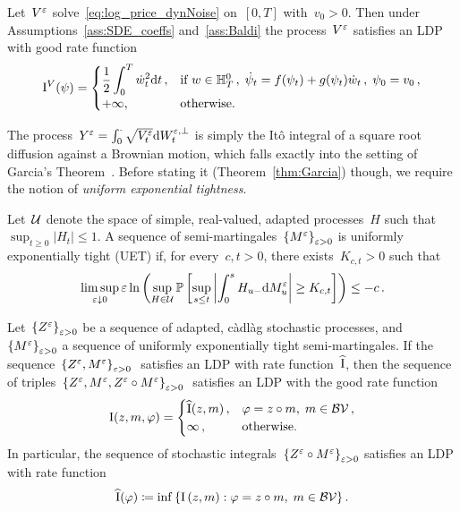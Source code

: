 \begin{theorem}
\label{thm:Baldi}
Let~$V^{\varepsilon}$ solve~\eqref{eq:log_price_dynNoise} on~$[0, T]$ with~$v_0>0$. Then under Assumptions~\ref{ass:SDE_coeffs} and~\ref{ass:Baldi} the process~$V^\varepsilon$ satisfies an LDP with good rate function
\[
\mathrm{I}^{V}(\psi)= \begin{cases}
\displaystyle \frac{1}{2} \int_{0}^{T} \dot{w}_t^2 \mathrm{d} t\,, 
& \text{if } w\in\mathbb{H}^0_T\,, \;\dot{\psi}_t = f(\psi_t) + g(\psi_t)\dot{w}_t\,, \;\psi_0 = v_0\,, \\ 
+\infty, & \text{otherwise}.
\end{cases}
\]
\end{theorem}
The process~$Y^\varepsilon=\int_0^\cdot \sqrt{V^\varepsilon_{t}} \mathrm{d} W^{\varepsilon,\perp}_{t}$ is simply the It{\^o} integral of a square root diffusion against a Brownian motion, which falls exactly into the setting of Garcia's Theorem~\cite{Garcia2007AIntegrals}. 
Before stating it (Theorem~\ref{thm:Garcia}) though, 
we require the notion of \textit{uniform exponential tightness}.
\begin{definition}\label{def:UET}
Let~$\mathcal{U}$ denote the space of simple, real-valued, adapted processes~$H$ such that~$\sup _{t \geq 0}\left|H_{t}\right| \leq 1$. A sequence of semi-martingales~$\left\{M^{\varepsilon}\right\}_{\varepsilon > 0}$ is uniformly exponentially tight (UET) if, for every~$c, t>0$, there exists~$K_{c, t}>0$ such that
\[
\limsup _{\varepsilon \downarrow 0} \varepsilon \ln \left(\sup _{H \in \mathcal{U}} \mathbb{P}\left[\sup _{s \leq t}\left|\int_{0}^{s} H_{u-} \mathrm{d} M_{u}^{\varepsilon}\right| \geq K_{c, t}\right]\right) \leq-c \,.
\]
\end{definition}
\begin{theorem}\label{thm:Garcia}
Let~$\left\{Z^{\varepsilon}\right\}_{\varepsilon > 0}$ be a sequence of adapted, c\`adl\`ag stochastic processes, and~$\left\{M^{\varepsilon}\right\}_{\varepsilon > 0}$ a sequence of uniformly exponentially tight semi-martingales. If the sequence~$\left\{Z^{\varepsilon}, M^{\varepsilon}\right\}_{\varepsilon > 0}~$ satisfies an LDP with rate function~$\widehat{\mathrm{I}}$, then the sequence of triples~$\left\{Z^{\varepsilon}, M^{\varepsilon}, Z^\varepsilon\circ M^\varepsilon\right\}_{\varepsilon > 0}~$ satisfies an LDP with the good rate function
\[
\mathrm{I}(z,m,\varphi)=\begin{cases}
\widehat{\mathrm{I}}(z,m)\,, & \varphi = z \circ m,\; m \in \mathcal{BV}\,, \\
\infty\,, & \text{otherwise}.
\end{cases}
\]
In particular, the sequence of stochastic integrals~$\left\{Z^{\varepsilon} \circ M^{\varepsilon}\right\}_{\varepsilon > 0}$ satisfies an LDP with rate function~$$\widehat{\mathrm{I}}(\varphi)\coloneqq\inf \left\{\mathrm{I}\left(z,m\right): \varphi=z \circ m,\; m \in \mathcal{BV}\right\}.$$
\end{theorem}
